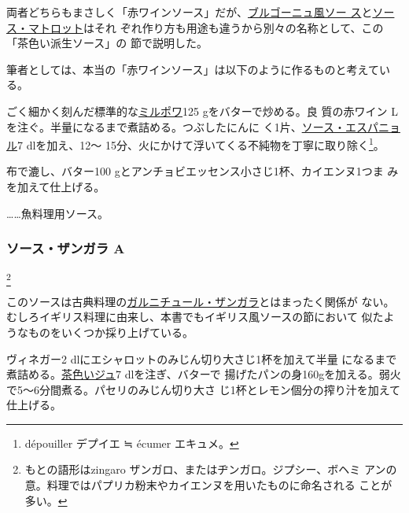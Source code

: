 \begin{recette}
両者どちらもまさしく「赤ワインソース」だが、\protect\hyperlink{sauce-bourguignonne}{ブルゴーニュ風ソー
ス}と\protect\hyperlink{sauce-matelote}{ソース・マトロット}はそれ
ぞれ作り方も用途も違うから別々の名称として、この「茶色い派生ソース」の
節で説明した。

筆者としては、本当の「赤ワインソース」は以下のように作るものと考えてい
る。

ごく細かく刻んだ標準的な\protect\hyperlink{mirepoix}{ミルポワ}125
gをバターで炒める。良 質の赤ワイン\undemi{}
Lを注ぐ。半量になるまで煮詰める。つぶしたにんに
く1片、\protect\hyperlink{sauce-espagnole}{ソース・エスパニョル}7\undemi{}
dlを加え、12〜
15分、火にかけて浮いてくる不純物を丁寧に取り除く\footnote{dépouiller
  デプイエ ≒ écumer エキュメ。}。

布で漉し、バター100 gとアンチョビエッセンス小さじ1杯、カイエンヌ1つま
みを加えて仕上げる。

\ldots{}\ldots{}魚料理用ソース。

\hypertarget{sauce-zingara-a}{%
\subsubsection{ソース・ザンガラ A}\label{sauce-zingara-a}}

\footnote{もとの語形はzingaro
  ザンガロ、またはヂンガロ。ジプシー、ボヘミ
  アンの意。料理ではパプリカ粉末やカイエンヌを用いたものに命名される
  ことが多い。}


このソースは古典料理の\protect\hyperlink{garniture-zingara}{ガルニチュール・ザンガラ}とはまったく関係が
ない。むしろイギリス料理に由来し、本書でもイギリス風ソースの節において
似たようなものをいくつか採り上げている。

ヴィネガー2\undemi{} dlにエシャロットのみじん切り大さじ1杯を加えて半量
になるまで煮詰める。\protect\hyperlink{jus-de-veau-lie}{茶色いジュ}7
dlを注ぎ、バターで
揚げたパンの身160gを加える。弱火で5〜6分間煮る。パセリのみじん切り大さ
じ1杯とレモン\undemi{}個分の搾り汁を加えて仕上げる。

\hypertarget{sauce-zingara-b}{%
}
\end{recette}
